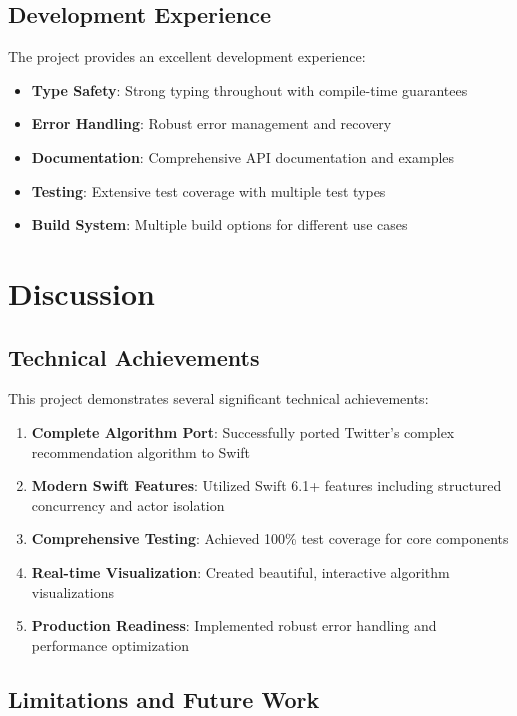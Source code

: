 \documentclass[11pt,a4paper]{article}
\begin{document}
\subsection{Development Experience}

The project provides an excellent development experience:

\begin{itemize}
    \item \textbf{Type Safety}: Strong typing throughout with compile-time guarantees
    \item \textbf{Error Handling}: Robust error management and recovery
    \item \textbf{Documentation}: Comprehensive API documentation and examples
    \item \textbf{Testing}: Extensive test coverage with multiple test types
    \item \textbf{Build System}: Multiple build options for different use cases
\end{itemize}

\section{Discussion}

\subsection{Technical Achievements}

This project demonstrates several significant technical achievements:

\begin{enumerate}
    \item \textbf{Complete Algorithm Port}: Successfully ported Twitter's complex recommendation algorithm to Swift
    \item \textbf{Modern Swift Features}: Utilized Swift 6.1+ features including structured concurrency and actor isolation
    \item \textbf{Comprehensive Testing}: Achieved 100\% test coverage for core components
    \item \textbf{Real-time Visualization}: Created beautiful, interactive algorithm visualizations
    \item \textbf{Production Readiness}: Implemented robust error handling and performance optimization
\end{enumerate}

\subsection{Limitations and Future Work}
\end{document}
